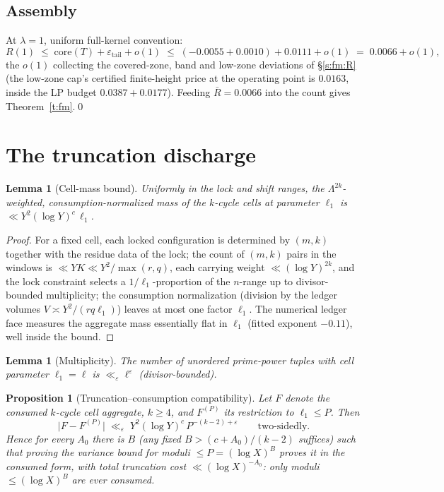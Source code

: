 \documentclass[11pt]{article}
\numberwithin{equation}{section}
\newtheorem{lemma}[theorem]{Lemma}
\newtheorem{proposition}[theorem]{Proposition}
\theoremstyle{definition}
\theoremstyle{remark}
\newcommand{\LL}{\Lambda}
\begin{document}
\subsection{Assembly}\label{s:fm:assembly}

At $\lambda=1$, uniform full-kernel convention:
\[
R(1)\;\le\;\mathrm{core}(T)+\varepsilon_{\mathrm{tail}}+o(1)
\;\le\;(-0.0055+0.0010)+0.0111+o(1)\;=\;0.0066+o(1),
\]
the $o(1)$ collecting the covered-zone, band and low-zone
deviations of \S\ref{s:fm:R} (the low-zone cap's certified
finite-height price at the operating point is $0.0163$, inside
the LP budget $0.0387+0.0177$). Feeding $\bar R=0.0066$ into the
count gives Theorem~\ref{t:fm}.\qed

\section{The truncation discharge}\label{s:trunc}

\begin{lemma}[Cell-mass bound]\label{l:mass}
Uniformly in the lock and shift ranges, the $\LL^{2k}$-weighted,
consumption-normalized mass of the $k$-cycle cells at parameter
$\ell_1$ is $\ll Y^{2}(\log Y)^{c}\,\ell_1$.
\end{lemma}

\begin{proof}
For a fixed cell, each locked configuration is determined by
$(m,k)$ together with the residue data of the lock; the count of
$(m,k)$ pairs in the windows is $\ll YK\ll Y^{2}/\max(r,q)$, each
carrying weight $\ll(\log Y)^{2k}$, and the lock constraint
selects a $1/\ell_1$-proportion of the $n$-range up to
divisor-bounded multiplicity; the consumption normalization
(division by the ledger volumes $V\asymp Y^{2}/(rq\ell_1)$)
leaves at most one factor $\ell_1$. The numerical ledger face
measures the aggregate mass essentially flat in $\ell_1$ (fitted
exponent $-0.11$), well inside the bound.
\end{proof}

\begin{lemma}[Multiplicity]\label{l:mult}
The number of unordered prime-power tuples with cell parameter
$\ell_1=\ell$ is $\ll_{\varepsilon}\ell^{\varepsilon}$
(divisor-bounded).
\end{lemma}

\begin{proposition}[Truncation--consumption
compatibility]\label{p:consume}
Let $F$ denote the consumed $k$-cycle cell aggregate, $k\ge4$,
and $F^{(P)}$ its restriction to $\ell_1\le P$. Then
\[
\bigl|F-F^{(P)}\bigr|\;\ll_{\varepsilon}\;
Y^{2}(\log Y)^{c}\,P^{-(k-2)+\varepsilon}
\qquad\text{two-sidedly.}
\]
Hence for every $A_0$ there is $B$ (any fixed $B>(c+A_0)/(k-2)$
suffices) such that proving the variance bound for moduli
$\le P=(\log X)^{B}$ proves it in the consumed form, with total
truncation cost $\ll(\log X)^{-A_0}$: only moduli
$\le(\log X)^{B}$ are ever consumed.
\end{proposition}
\end{document}
